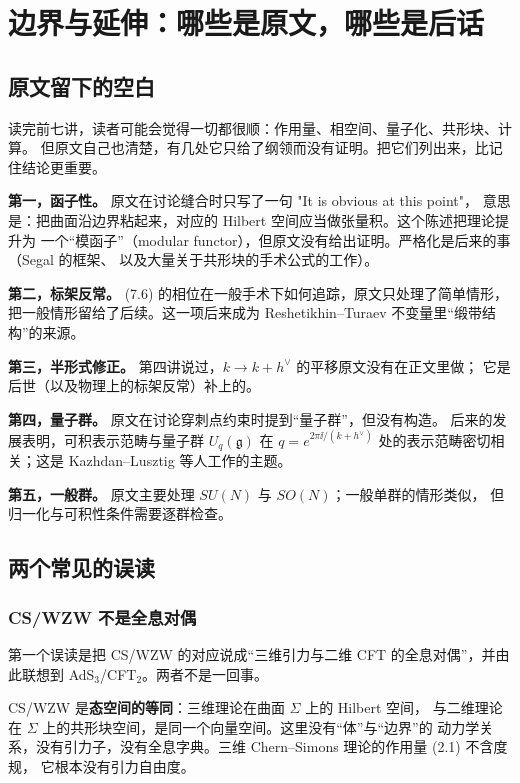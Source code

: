\section{边界与延伸：哪些是原文，哪些是后话}

\subsection{原文留下的空白}

读完前七讲，读者可能会觉得一切都很顺：作用量、相空间、量子化、共形块、计算。
但原文自己也清楚，有几处它只给了纲领而没有证明。把它们列出来，比记住结论更重要。

\textbf{第一，函子性。} 原文在讨论缝合时只写了一句 "It is obvious at this point"，
意思是：把曲面沿边界粘起来，对应的 Hilbert 空间应当做张量积。这个陈述把理论提升为
一个“模函子”（modular functor），但原文没有给出证明。严格化是后来的事（Segal 的框架、
以及大量关于共形块的手术公式的工作）。

\textbf{第二，标架反常。} (7.6) 的相位在一般手术下如何追踪，原文只处理了简单情形，
把一般情形留给了后续。这一项后来成为 Reshetikhin--Turaev 不变量里“缎带结构”的来源。

\textbf{第三，半形式修正。} 第四讲说过，$k\to k+h^\vee$ 的平移原文没有在正文里做；
它是后世（以及物理上的标架反常）补上的。

\textbf{第四，量子群。} 原文在讨论穿刺点约束时提到“量子群”，但没有构造。
后来的发展表明，可积表示范畴与量子群 $U_q(\mathfrak g)$ 在 $q=e^{2\pi\ii/(k+h^\vee)}$
处的表示范畴密切相关；这是 Kazhdan--Lusztig 等人工作的主题。

\textbf{第五，一般群。} 原文主要处理 $SU(N)$ 与 $SO(N)$；一般单群的情形类似，
但归一化与可积性条件需要逐群检查。

\subsection{两个常见的误读}

\subsubsection{CS/WZW 不是全息对偶}

第一个误读是把 CS/WZW 的对应说成“三维引力与二维 CFT 的全息对偶”，并由此联想到
AdS$_3$/CFT$_2$。两者不是一回事。

CS/WZW 是\textbf{态空间的等同}：三维理论在曲面 $\Sigma$ 上的 Hilbert 空间，
与二维理论在 $\Sigma$ 上的共形块空间，是同一个向量空间。这里没有“体”与“边界”的
动力学关系，没有引力子，没有全息字典。三维 Chern--Simons 理论的作用量 (2.1) 不含度规，
它根本没有引力自由度。

